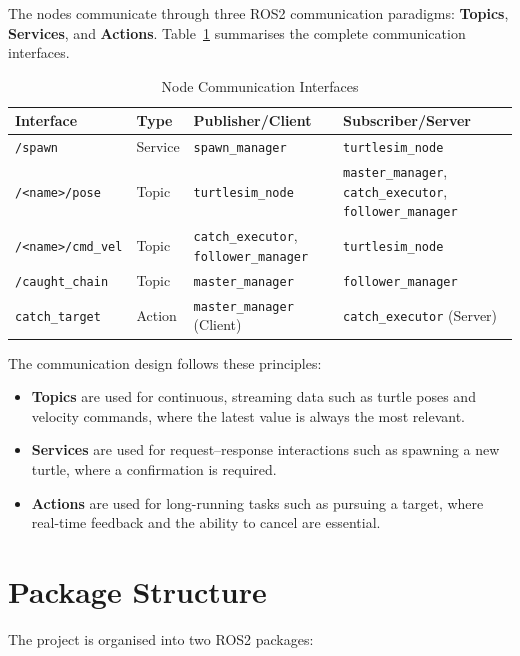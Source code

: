 The nodes communicate through three ROS2 communication paradigms: \textbf{Topics}, \textbf{Services}, and \textbf{Actions}. Table~\ref{tab:communication} summarises the complete communication interfaces.

\begin{table}[htbp]
\centering
\caption{Node Communication Interfaces}
\label{tab:communication}
\begin{tabular}{llll}
\toprule
\textbf{Interface} & \textbf{Type} & \textbf{Publisher/Client} & \textbf{Subscriber/Server} \\
\midrule
\texttt{/spawn} & Service & \texttt{spawn\_manager} & \texttt{turtlesim\_node} \\
\texttt{/<name>/pose} & Topic & \texttt{turtlesim\_node} & \texttt{master\_manager}, \texttt{catch\_executor}, \texttt{follower\_manager} \\
\texttt{/<name>/cmd\_vel} & Topic & \texttt{catch\_executor}, \texttt{follower\_manager} & \texttt{turtlesim\_node} \\
\texttt{/caught\_chain} & Topic & \texttt{master\_manager} & \texttt{follower\_manager} \\
\texttt{catch\_target} & Action & \texttt{master\_manager} (Client) & \texttt{catch\_executor} (Server) \\
\bottomrule
\end{tabular}
\end{table}

The communication design follows these principles:

\begin{itemize}
  \item \textbf{Topics} are used for continuous, streaming data such as turtle poses and velocity commands, where the latest value is always the most relevant.
  \item \textbf{Services} are used for request--response interactions such as spawning a new turtle, where a confirmation is required.
  \item \textbf{Actions} are used for long-running tasks such as pursuing a target, where real-time feedback and the ability to cancel are essential.
\end{itemize}

\section{Package Structure}

The project is organised into two ROS2 packages:


